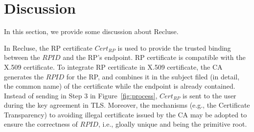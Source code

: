\section{Discussion}
\label{sec:discussion}
In this section, we provide some discussion about Recluse.



 In Recluse, the RP certificate $Cert_{RP}$ is used to provide the trusted binding between the $RPID$ and the RP's endpoint. RP certificate is compatible with the X.509 certificate. To integrate RP certificate in X.509 certificate, the CA generates the $RPID$ for the RP, and combines it in the subject  filed (in detail, the common name)  of the certificate while the endpoint is already contained. Instead of sending  in Step 3 in Figure~\ref{fig:process}, $Cert_{RP}$  is sent to the user during the key agreement in TLS. Moreover, the mechanisms (e.g., the Certificate Transparency) to avoiding illegal certificate issued by the CA may be adopted to ensure the correctness of $RPID$, i.e., gloally unique and being the primitive root.


